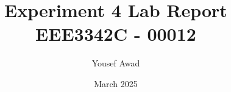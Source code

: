

\documentclass{article}
\usepackage{graphicx} %
\usepackage{varwidth}
\usepackage{listings}
\usepackage{xcolor}

\title{Experiment 4 Lab Report \\ \large EEE3342C - 00012}
\author{Yousef Awad}
\date{March 2025}
\setcounter{secnumdepth}{0}




\maketitle
\tableofcontents
\newpage

\section{Equipment}
For this experiment a computer running Linux 6.12.13 was used alongside the Xilinx Vivado 2024.2 software, alongside an FPGA board, the BASYS 3 development board. The board specifically only used to ensure the simulation by the Vivado software was accurate in the real world, as well as to verify the simulation software wasn't incorrect.
\section{Objective}
